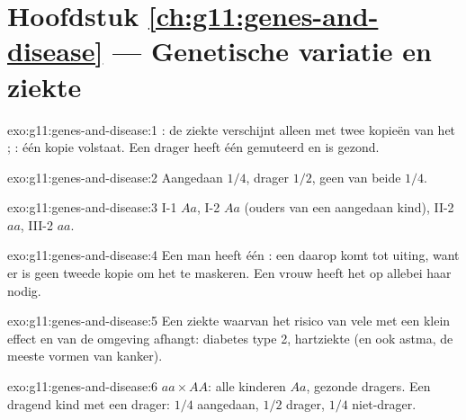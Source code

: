 \section*{Hoofdstuk \ref{ch:g11:genes-and-disease} --- Genetische variatie en ziekte}

\begin{solution}{exo:g11:genes-and-disease:1}
: de ziekte verschijnt alleen met twee kopieën van het ;
: één kopie volstaat. Een drager heeft één  gemuteerd
 en is gezond.
\end{solution}

\begin{solution}{exo:g11:genes-and-disease:2}
Aangedaan $1/4$, drager $1/2$, geen van beide $1/4$.
\end{solution}

\begin{solution}{exo:g11:genes-and-disease:3}
I-1 $Aa$, I-2 $Aa$ (ouders van een aangedaan kind), II-2 $aa$, III-2
$aa$.
\end{solution}

\begin{solution}{exo:g11:genes-and-disease:4}
Een man heeft één : een   daarop komt tot
uiting, want er is geen tweede kopie om het te maskeren. Een vrouw heeft
het  op allebei haar  nodig.
\end{solution}

\begin{solution}{exo:g11:genes-and-disease:5}
Een ziekte waarvan het risico van vele  met een klein effect en van
de omgeving afhangt: diabetes type 2, hartziekte (en ook astma, de meeste
vormen van kanker).
\end{solution}

\begin{solution}{exo:g11:genes-and-disease:6}
$aa \times AA$: alle kinderen $Aa$, gezonde dragers. Een dragend kind met
een drager: $1/4$ aangedaan, $1/2$ drager, $1/4$ niet-drager.
\end{solution}


